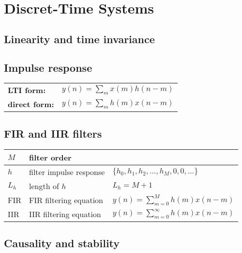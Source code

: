 \section{Discret-Time Systems}
\subsection{Linearity and time invariance}


\subsection{Impulse response}
\begin{tabular}{ll}
	\textbf{LTI form:}		& $y(n) = \sum\limits_m x(m)h(n-m)$ \\
	\textbf{direct form:}	& $y(n) = \sum\limits_m h(m)x(n-m)$
\end{tabular}


\subsection{FIR and IIR filters}
\begin{tabular}{|l|l|l|}
	\hline
	$M$	& filter order				& 
	\\ \hline
	$h$	& filter impulse response	& $\{ h_0, h_1, h_2, \ldots , h_M, 0, 0, \ldots\}$
	\\ \hline
	$L_h$	& length of $h$			& $L_h = M + 1$
	\\ \hline
	FIR		& FIR filtering equation	& $y(n) = \sum\limits_{m=0}^{M} h(m)x(n-m)$
	\\ \hline
	IIR		& IIR filtering equation	& $y(n) = \sum\limits_{m=0}^{\infty} h(m)x(n-m)$
	\\ \hline
\end{tabular}


\subsection{Causality and stability}
